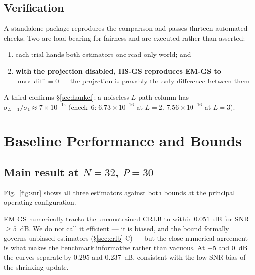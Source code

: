 \documentclass[journal]{IEEEtran}
\begin{document}
\subsection{Verification}

A standalone package reproduces the comparison and passes thirteen automated
checks. Two are load-bearing for fairness and are executed rather than
asserted:
\begin{enumerate}
\item each trial hands both estimators one read-only world; and
\item \textbf{with the projection disabled, HS-GS reproduces EM-GS to
$\max|\mathrm{diff}|=0$} --- the projection is provably the only difference
between them.
\end{enumerate}
A third confirms \S\ref{sec:hankel}: a noiseless $L$-path column has
$\sigma_{L+1}/\sigma_1\approx7\times10^{-16}$ (check~6: $6.73\times10^{-16}$
at $L=2$, $7.56\times10^{-16}$ at $L=3$).

\section{Baseline Performance and Bounds}\label{sec:bounds}

\subsection{Main result at $N=32$, $P=30$}

Fig.~\ref{fig:snr} shows all three estimators against both bounds at the
principal operating configuration.

EM-GS numerically tracks the unconstrained CRLB to within $0.051$~dB for
SNR $\ge5$~dB. We do not call it efficient --- it is biased, and the bound
formally governs unbiased estimators (\S\ref{sec:crlb}-C) --- but the close
numerical agreement is what makes the benchmark informative rather than vacuous.
At $-5$ and $0$~dB the curves separate by $0.295$ and $0.237$~dB, consistent
with the low-SNR bias of the shrinking update.
\end{document}
